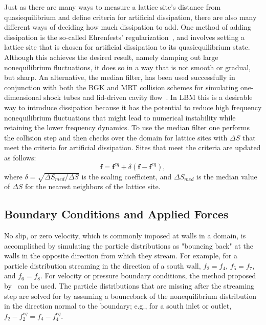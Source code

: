 Just as there are many ways to measure a lattice site's distance from quasiequilibrium and define criteria for artificial dissipation, there are also many different ways of deciding how much dissipation to add.
One method of adding dissipation is the so-called Ehrenfests' regularization~\cite{brownlee2006stabilization}, and involves setting a lattice site that is chosen for artificial dissipation to its quasiequilibrium state.
Although this achieves the desired result, namely damping out large nonequilibrium fluctuations, it does so in a way that is not smooth or gradual, but sharp.
An alternative, the median filter, has been used successfully in conjunction with both the BGK and MRT collision schemes for simulating one-dimensional shock tubes and lid-driven cavity flow~\cite{brownlee2008nonequilibrium,gorban2014enhancement,packwood2009entropy}.
In LBM this is a desirable way to introduce dissipation because it has the potential to reduce high frequency nonequilibrium fluctuations that might lead to numerical instability while retaining the lower frequency dynamics.
To use the median filter one performs the collision step and then checks over the domain for lattice sites with $\Delta S$ that meet the criteria for artificial dissipation.
Sites that meet the criteria are updated as follows:
\begin{equation} \label{eq:median-filter}
\mathbf{f} = \mathbf{f}^{eq} + \delta (\mathbf{f} - \mathbf{f}^{eq}),
\end{equation}
\noindent where $\delta = \sqrt{\Delta S_{med} / \Delta S}$ is the scaling coefficient, and $\Delta S_{med}$ is the median value of $\Delta S$ for the nearest neighbors of the lattice site.

\subsection{Boundary Conditions and Applied Forces} \label{sec:bcs}

No slip, or zero velocity, which is commonly imposed at walls in a domain, is accomplished by simulating the particle distributions as "bouncing back" at the walls in the opposite direction from which they stream.
For example, for a particle distribution streaming in the direction of a south wall, $f_2 = f_4$, $f_5 = f_7$, and $f_6 = f_8$.
For velocity or pressure boundary conditions, the method proposed by~\citet{zou1997pressure} can be used.
The particle distributions that are missing after the streaming step are solved for by assuming a bounceback of the nonequilibrium distribution in the direction normal to the boundary; e.g., for a south inlet or outlet, $f_2 - f_2^{eq} = f_4 - f_4^{eq}$.

